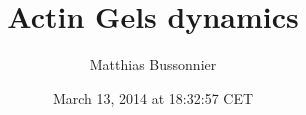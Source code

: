 \documentclass[A4paperpaper,11pt,english]{sphinxmanual}
\title{Actin Gels dynamics}
\date{March 13, 2014 at 18:32:57 CET}
\author{Matthias Bussonnier}
\begin{document}
\maketitle

\tableofcontents
\cleardoublepage
\pagestyle{normal}
 
\label{index-latex::doc}
\end{document}
